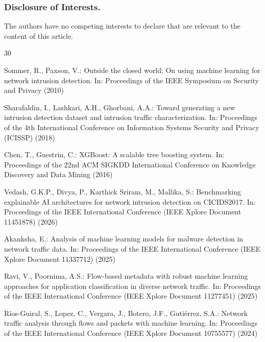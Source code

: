 \documentclass[twocolumn]{llncs}
\begin{document}
 

\begin{credits}
\subsubsection{Disclosure of Interests.}
The authors have no competing interests to declare that are relevant to the content of this
article.
\end{credits}

\begin{thebibliography}{30}

Sommer, R., Paxson, V.: Outside the closed world: On using machine learning for network intrusion
detection. In: Proceedings of the IEEE Symposium on Security and Privacy (2010)

Sharafaldin, I., Lashkari, A.H., Ghorbani, A.A.: Toward generating a new intrusion detection
dataset and intrusion traffic characterization. In: Proceedings of the 4th International
Conference on Information Systems Security and Privacy (ICISSP) (2018)

Chen, T., Guestrin, C.: XGBoost: A scalable tree boosting system. In: Proceedings of the 22nd ACM
SIGKDD International Conference on Knowledge Discovery and Data Mining (2016)

Vedash, G.K.P., Divya, P., Karthick Sriram, M., Mallika, S.: Benchmarking explainable AI
architectures for network intrusion detection on CICIDS2017. In: Proceedings of the IEEE
International Conference (IEEE Xplore Document 11451878) (2026)

Akanksha, E.: Analysis of machine learning models for malware detection in network traffic data.
In: Proceedings of the IEEE International Conference (IEEE Xplore Document 11337712) (2025)

Ravi, V., Poornima, A.S.: Flow-based metadata with robust machine learning approaches for
application classification in diverse network traffic. In: Proceedings of the IEEE International
Conference (IEEE Xplore Document 11277451) (2025)

R{\'i}os-Guiral, S., Lopez, C., Vergara, J., Botero, J.F., Guti\'{e}rrez, S.A.: Network traffic
analysis through flows and packets with machine learning. In: Proceedings of the IEEE
International Conference (IEEE Xplore Document 10755577) (2024)


\end{thebibliography}
\end{document}
